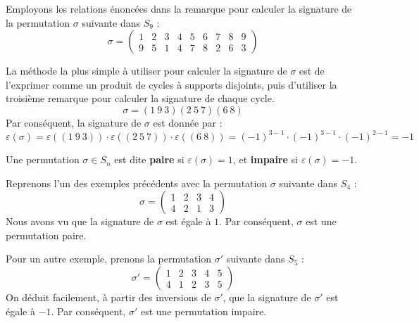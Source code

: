 \documentclass[12pt, a4paper]{report}
\begin{document}
\begin{example}
    Employons les relations énoncées dans la remarque pour calculer la signature de la permutation $\sigma$ suivante dans $S_9$ :
    $$\sigma = \left(\begin{matrix} 1 & 2 & 3 & 4 & 5 & 6 & 7 & 8 & 9 \\ 9 & 5 & 1 & 4 & 7 & 8 & 2 & 6 & 3 \end{matrix}\right)$$

    La méthode la plus simple à utiliser pour calculer la signature de $\sigma$ est de l'exprimer comme un produit de cycles à supports disjoints, puis d'utiliser la troisième remarque pour calculer la signature de chaque cycle.
    $$\sigma = (1 \ 9 \ 3)(2 \ 5 \ 7)(6 \ 8)$$
    Par conséquent, la signature de $\sigma$ est donnée par :
    $$\varepsilon(\sigma) = \varepsilon((1 \ 9 \ 3)) \cdot \varepsilon((2 \ 5 \ 7)) \cdot \varepsilon((6 \ 8)) = (-1)^{3-1} \cdot (-1)^{3-1} \cdot (-1)^{2-1} = -1$$
\end{example}

\begin{definition}
    Une permutation $\sigma \in S_n$ est dite \textbf{paire} si $\varepsilon(\sigma) = 1$, et \textbf{impaire} si $\varepsilon(\sigma) = -1$.
\end{definition}

\begin{example}
    Reprenons l'un des exemples précédents avec la permutation $\sigma$ suivante dans $S_4$ :
    $$\sigma = \left(\begin{matrix} 1 & 2 & 3 & 4 \\ 4 & 2 & 1 & 3 \end{matrix}\right)$$
    Nous avons vu que la signature de $\sigma$ est égale à $1$. Par conséquent, $\sigma$ est une permutation paire.

    Pour un autre exemple, prenons la permutation $\sigma'$ suivante dans $S_5$ :
    $$\sigma' = \left(\begin{matrix} 1 & 2 & 3 & 4 & 5 \\ 4 & 1 & 2 & 3 & 5 \end{matrix}\right)$$
    On déduit facilement, à partir des inversions de $\sigma'$, que la signature de $\sigma'$ est égale à $-1$. Par conséquent, $\sigma'$ est une permutation impaire.
\end{example}
\end{document}
